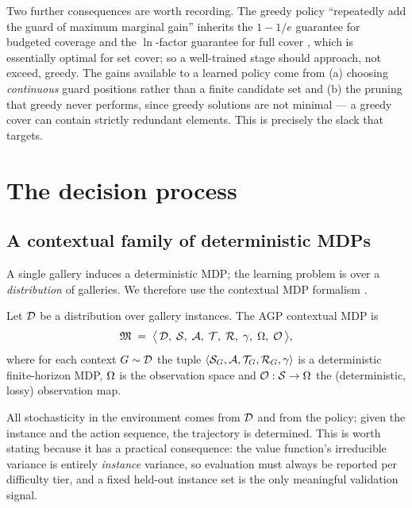 \documentclass[11pt,a4paper]{article}
\begin{document}
Two further consequences are worth recording. The greedy policy ``repeatedly add the
guard of maximum marginal gain'' inherits the $1 - 1/e$ guarantee for budgeted coverage
\cite{nemhauser1978} and the $\ln$-factor guarantee for full cover \cite{feige1998}, which
is essentially optimal for set cover; so a well-trained \stageI{} stage should approach,
not exceed, greedy. The gains available to a learned policy come from (a) choosing
\emph{continuous} guard positions rather than a finite candidate set and (b) the pruning
that greedy never performs, since greedy solutions are not minimal --- a greedy cover can
contain strictly redundant elements. This is precisely the slack that \stageII{} targets.

\section{The decision process}

\subsection{A contextual family of deterministic MDPs}

A single gallery induces a deterministic MDP; the learning problem is over a
\emph{distribution} of galleries. We therefore use the contextual MDP formalism
\cite{hallak2015contextual}.

\begin{definition}
Let $\mathcal{D}$ be a distribution over gallery instances. The AGP contextual MDP is
\[
  \mathfrak{M} \;=\; \bigl\langle\, \mathcal{D},\; \mathcal{S},\; \mathcal{A},\; \mathcal{T},\; \mathcal{R},\; \gamma,\; \Omega,\; \mathcal{O} \,\bigr\rangle,
\]
where for each context $G \sim \mathcal{D}$ the tuple
$\langle \mathcal{S}_G, \mathcal{A}, \mathcal{T}_G, \mathcal{R}_G, \gamma \rangle$ is a
deterministic finite-horizon MDP, $\Omega$ is the observation space and
$\mathcal{O}: \mathcal{S} \to \Omega$ the (deterministic, lossy) observation map.
\end{definition}

All stochasticity in the environment comes from $\mathcal{D}$ and from the policy; given the
instance and the action sequence, the trajectory is determined. This is worth stating
because it has a practical consequence: the value function's irreducible variance is
entirely \emph{instance} variance, so evaluation must always be reported per difficulty
tier, and a fixed held-out instance set is the only meaningful validation signal.
\end{document}
